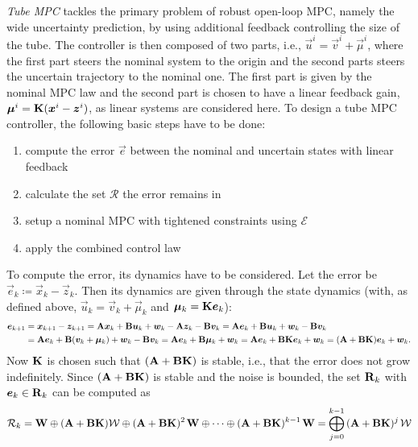 		\emph{Tube MPC} tackles the primary problem of robust open-loop MPC, namely the wide uncertainty prediction, by using additional feedback controlling the size of the tube. The controller is then composed of two parts, i.e., \( \vec{u}^i = \vec{v}^i + \vec{\mu}^i \), where the first part steers the nominal system to the origin and the second parts steers the uncertain trajectory to the nominal one. The first part is given by the nominal MPC law and the second part is chosen to have a linear feedback gain, \( \bm{\mu}^i = \bm{\mathrm{K}} (\bm{x}^i - \bm{z}^i) \), as linear systems are considered here. To design a tube MPC controller, the following basic steps have to be done:
		\begin{enumerate}
			\item compute the error \( \vec{e} \) between the nominal and uncertain states with linear feedback
			\item calculate the set \(\mathcal{R}\) the error remains in
			\item setup a nominal MPC with tightened constraints using \(\mathcal{E}\)
			\item apply the combined control law
		\end{enumerate}
		To compute the error, its dynamics have to be considered. Let the error be \( \vec{e}_k \coloneqq \vec{x}_k - \vec{z}_k \). Then its dynamics are given through the state dynamics (with, as defined above, \( \vec{u}_k = \vec{v}_k + \vec{\mu}_k \) and \( \bm{\mu}_k = \bm{\mathrm{K}} \bm{e}_k \)):
		\begin{align}
			\bm{e}_{k + 1}
				&= \bm{x}_{k + 1} - \bm{z}_{k + 1}
				 = \bm{\mathrm{A}} \bm{x}_k + \bm{\mathrm{B}} \bm{u}_k + \bm{w}_k - \bm{\mathrm{A}} \bm{z}_k - \bm{\mathrm{B}} \bm{v}_k
				 = \bm{\mathrm{A}} \bm{e}_k + \bm{\mathrm{B}} \bm{u}_k + \bm{w}_k - \bm{\mathrm{B}} \bm{v}_k \\
				&= \bm{\mathrm{A}} \bm{e}_k + \bm{\mathrm{B}} (\bm{v}_k + \bm{\mu}_k) + \bm{w}_k - \bm{\mathrm{B}} \bm{v}_k
				 = \bm{\mathrm{A}} \bm{e}_k + \bm{\mathrm{B}} \bm{\mu}_k + \bm{w}_k
				 = \bm{\mathrm{A}} \bm{e}_k + \bm{\mathrm{B}} \bm{\mathrm{K}} \bm{e}_k + \bm{w}_k
				 = (\bm{\mathrm{A}} + \bm{\mathrm{B}} \bm{\mathrm{K}}) \bm{e}_k + \bm{w}_k.
		\end{align}
		Now \(\bm{\mathrm{K}}\) is chosen such that \( (\bm{\mathrm{A}} + \bm{\mathrm{B}} \bm{\mathrm{K}}) \) is stable, i.e., that the error does not grow indefinitely. Since \( (\bm{\mathrm{A}} + \bm{\mathrm{B}} \bm{\mathrm{K}}) \) is stable and the noise is bounded, the set \( \bm{\mathrm{R}}_k \) with \( \bm{e}_k \in \bm{\mathrm{R}}_k \) can be computed as
		\begin{equation}
			\mathcal{R}_k
				= \bm{\mathrm{W}} \oplus (\bm{\mathrm{A}} + \bm{\mathrm{B}} \bm{\mathrm{K}}) \mathcal{W} \oplus (\bm{\mathrm{A}} + \bm{\mathrm{B}} \bm{\mathrm{K}})^{2\,} \bm{\mathrm{W}} \oplus \cdots \oplus (\bm{\mathrm{A}} + \bm{\mathrm{B}} \bm{\mathrm{K}})^{k - 1\,} \bm{\mathrm{W}}
				= \bigoplus_{j = 0}^{k - 1}\, (\bm{\mathrm{A}} + \bm{\mathrm{B}} \bm{\mathrm{K}})^{j\,} \mathcal{W}
		\end{equation}
